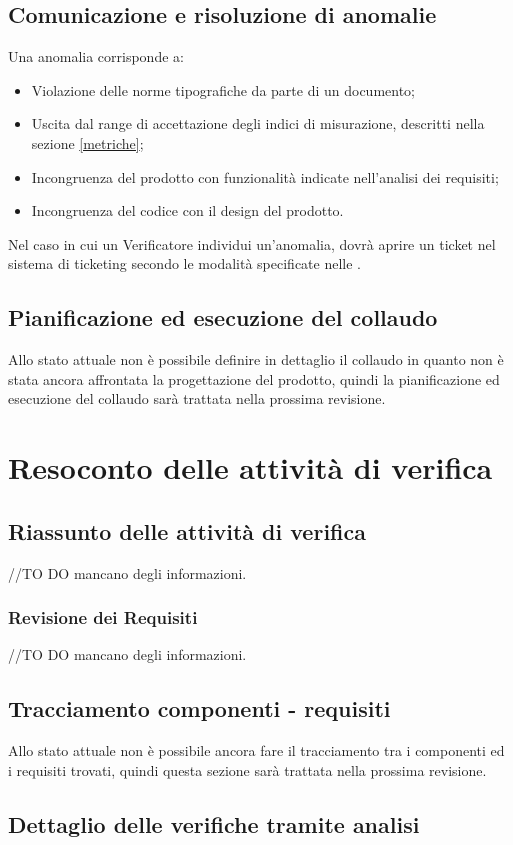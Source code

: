 \documentclass[12pt,a4paper]{article}
\begin{document}
\subsection{Comunicazione e risoluzione di anomalie}
Una anomalia corrisponde a:
\begin{itemize}
\item Violazione delle norme tipografiche da parte di un documento;
\item Uscita dal range di accettazione degli indici di misurazione, descritti nella sezione \ref{metriche};
\item Incongruenza del prodotto con funzionalità indicate nell’analisi dei requisiti;
\item Incongruenza del codice con il design del prodotto.
\end{itemize}
Nel caso in cui un Verificatore individui un’anomalia, dovrà aprire un ticket nel sistema di ticketing secondo le modalità specificate nelle \NdP.
\newpage
\subsection{Pianificazione ed esecuzione del collaudo}
Allo stato attuale non è possibile definire in dettaglio il collaudo in quanto non è stata ancora affrontata la
progettazione del prodotto, quindi la pianificazione ed esecuzione del collaudo sarà trattata nella prossima revisione.

\newpage
\appendix
\section{ Resoconto delle attività di verifica}
\subsection{Riassunto delle attività di verifica}
//TO DO \IB mancano degli informazioni.
\subsubsection{Revisione dei Requisiti}
//TO DO \IB mancano degli informazioni.
\subsection{Tracciamento componenti - requisiti}
Allo stato attuale non è possibile ancora fare il tracciamento tra i componenti ed i requisiti trovati, quindi questa sezione sarà trattata nella prossima revisione.
\subsection{Dettaglio delle verifiche tramite analisi}
\end{document}
